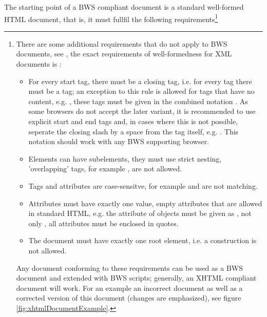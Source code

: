 The starting point of a BWS compliant document is a standard well-formed HTML document, that is, it must fullfil the following requirements\footnote{There are some additional requirements that do not apply to BWS documents, see \cite{references}, the exact requirements of well-formedness for XML documents is \cite{w3reference}:

\begin{itemize}

\item For every start tag, there must be a closing tag, i.e. for every  tag there must be a  tag; an exception to this rule is allowed for tags that have no content, e.g. , these tags must be given in the combined notation . As some browsers do not accept the later variant, it is recommended to use explicit start and end tags and, in cases where this is not possible, seperate the closing slash by a space from the tag itself, e.g. . This notation should work with any BWS supporting browser.

\item Elements can have subelements, they must use strict nesting, 'overlapping' tags, for example , are not allowed.

\item Tags and attributes are case-sensitve, for example  and  are not matching.

\item Attributes must have exactly one value, empty attributes that are allowed in standard HTML, e.g. the  attribute of objects must be given as , not only , all attributes must be enclosed in quotes.

\item The document must have exactly one root element, i.e. a construction  is not allowed. 


\end{itemize}

Any document conforming to these requirements can be used as a BWS document and extended with BWS scripts; generally, an XHTML compliant document will work. For an example an incorrect document as well as a corrected version of this document (changes are emphasized), see figure \ref{fig:xhtmlDocumentExample}. 

}
